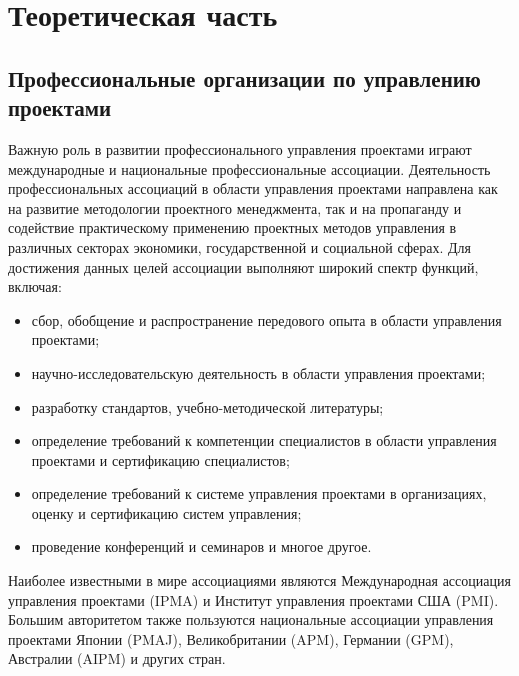 \section{Теоретическая часть}
\subsection{Профессиональные организации по управлению проектами}

Важную роль в развитии профессионального управления проектами играют международные и национальные профессиональные ассоциации.
Деятельность профессиональных ассоциаций в области управления проектами направлена как на развитие методологии проектного менеджмента, так и на пропаганду и содействие практическому применению проектных методов управления в различных секторах экономики, государственной и социальной сферах.
Для достижения данных целей ассоциации выполняют широкий спектр функций, включая:
\begin{itemize}
	\item сбор, обобщение и распространение передового опыта в области управления проектами;
	\item научно-исследовательскую деятельность в области управления проектами;
	\item разработку стандартов, учебно-методической литературы;
	\item  определение требований к компетенции специалистов в области управления проектами и сертификацию специалистов;
	\item  определение требований к системе управления проектами в организациях, оценку и сертификацию систем управления;
	\item  проведение конференций и семинаров и многое другое.
\end{itemize}

Наиболее известными в мире ассоциациями являются Международная ассоциация управления проектами (IPMA) и Институт управления проектами США (PMI).
Большим авторитетом также пользуются национальные ассоциации управления проектами Японии (PMAJ), Великобритании (APM), Германии (GPM), Австралии (AIPM) и других стран.

